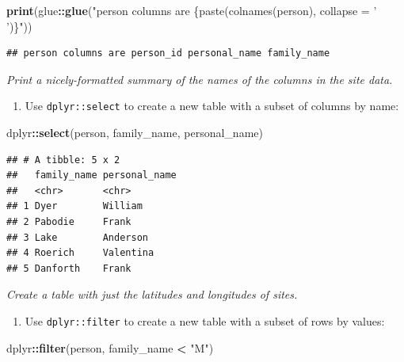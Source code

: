 \documentclass[]{Nemilov}
\newenvironment{Shaded}{\begin{snugshade}}{\end{snugshade}}
\newcommand{\KeywordTok}[1]{\textcolor[rgb]{0.13,0.29,0.53}{\textbf{#1}}}
\newcommand{\NormalTok}[1]{#1}
\newcommand{\OperatorTok}[1]{\textcolor[rgb]{0.81,0.36,0.00}{\textbf{#1}}}
\newcommand{\StringTok}[1]{\textcolor[rgb]{0.31,0.60,0.02}{#1}}
\providecommand{\tightlist}{%
  \setlength{\itemsep}{0pt}\setlength{\parskip}{0pt}}
\begin{document}
\begin{Shaded}
\begin{Highlighting}[]
\KeywordTok{print}\NormalTok{(glue}\OperatorTok{::}\KeywordTok{glue}\NormalTok{(}\StringTok{"person columns are \{paste(colnames(person), collapse = ' ')\}"}\NormalTok{))}
\end{Highlighting}
\end{Shaded}

\begin{verbatim}
## person columns are person_id personal_name family_name
\end{verbatim}

\emph{Print a nicely-formatted summary of the names of the columns in the site data.}

\begin{enumerate}
\def\labelenumi{\arabic{enumi}.}
\setcounter{enumi}{5}
\tightlist
\item
  Use \texttt{dplyr::select} to create a new table with a subset of columns by name:
\end{enumerate}

\begin{Shaded}
\begin{Highlighting}[]
\NormalTok{dplyr}\OperatorTok{::}\KeywordTok{select}\NormalTok{(person, family_name, personal_name)}
\end{Highlighting}
\end{Shaded}

\begin{verbatim}
## # A tibble: 5 x 2
##   family_name personal_name
##   <chr>       <chr>        
## 1 Dyer        William      
## 2 Pabodie     Frank        
## 3 Lake        Anderson     
## 4 Roerich     Valentina    
## 5 Danforth    Frank
\end{verbatim}

\emph{Create a table with just the latitudes and longitudes of sites.}

\begin{enumerate}
\def\labelenumi{\arabic{enumi}.}
\setcounter{enumi}{6}
\tightlist
\item
  Use \texttt{dplyr::filter} to create a new table with a subset of rows by values:
\end{enumerate}

\begin{Shaded}
\begin{Highlighting}[]
\NormalTok{dplyr}\OperatorTok{::}\KeywordTok{filter}\NormalTok{(person, family_name }\OperatorTok{<}\StringTok{ "M"}\NormalTok{)}
\end{Highlighting}
\end{Shaded}
\end{document}
